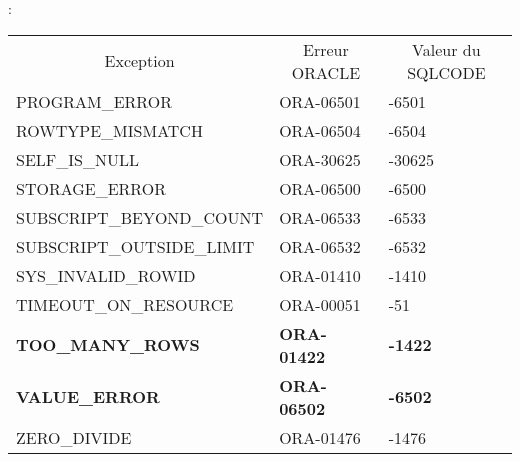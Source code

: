 \documentclass[10pt]{beamer}
\begin{document}
\begin{frame}{\secname : \subsecname}
    \begin{table}[]
        \begin{tabular}{lll}
            \multicolumn{1}{c}{{\color[HTML]{333333} Exception}} & \multicolumn{1}{c}{{\color[HTML]{333333} Erreur ORACLE}} & \multicolumn{1}{c}{{\color[HTML]{333333} Valeur du SQLCODE}} \\
            {\color[HTML]{333333} PROGRAM\_ERROR}                & {\color[HTML]{333333} ORA-06501}                         & {\color[HTML]{333333} -6501}                                 \\
            {\color[HTML]{333333} ROWTYPE\_MISMATCH}             & {\color[HTML]{333333} ORA-06504}                         & {\color[HTML]{333333} -6504}                                 \\
            {\color[HTML]{333333} SELF\_IS\_NULL}                & {\color[HTML]{333333} ORA-30625}                         & {\color[HTML]{333333} -30625}                                \\
            {\color[HTML]{333333} STORAGE\_ERROR}                & {\color[HTML]{333333} ORA-06500}                         & {\color[HTML]{333333} -6500}                                 \\
            {\color[HTML]{333333} SUBSCRIPT\_BEYOND\_COUNT}      & {\color[HTML]{333333} ORA-06533}                         & {\color[HTML]{333333} -6533}                                 \\
            {\color[HTML]{333333} SUBSCRIPT\_OUTSIDE\_LIMIT}     & {\color[HTML]{333333} ORA-06532}                         & {\color[HTML]{333333} -6532}                                 \\
            {\color[HTML]{333333} SYS\_INVALID\_ROWID}           & {\color[HTML]{333333} ORA-01410}                         & {\color[HTML]{333333} -1410}                                 \\
            {\color[HTML]{333333} TIMEOUT\_ON\_RESOURCE}         & {\color[HTML]{333333} ORA-00051}                         & {\color[HTML]{333333} -51}                                   \\
            {\color[HTML]{333333} \textbf{TOO\_MANY\_ROWS}}      & {\color[HTML]{333333} \textbf{ORA-01422}}                & {\color[HTML]{333333} \textbf{-1422}}                        \\
            {\color[HTML]{333333} \textbf{VALUE\_ERROR}}         & {\color[HTML]{333333} \textbf{ORA-06502}}                & {\color[HTML]{333333} \textbf{-6502}}                        \\
            {\color[HTML]{333333} ZERO\_DIVIDE}                  & {\color[HTML]{333333} ORA-01476}                         & {\color[HTML]{333333} -1476}
        \end{tabular}
    \end{table}
\end{frame}
\end{document}
